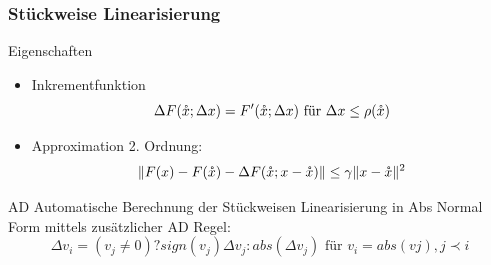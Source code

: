 \begin{frame}[<+->]
\frametitle{Stückweise Linearisierung}
\begin{block}{Eigenschaften}
 \begin{itemize}
  \item Inkrementfunktion 
    \[\Delta F(\mathring{x};\Delta x) = F'(\mathring{x};\Delta x)~ \text{für } \Delta x \leq \rho(\mathring{x})\]
  \item Approximation 2. Ordnung: \[\|F(x) - F(\mathring{x})- \Delta F(\mathring{x};x-\mathring{x})\| \leq \gamma \|x-\mathring{x}\|^2\]
 \end{itemize}
\end{block}
\begin{block}{AD}
 Automatische Berechnung der Stückweisen Linearisierung in Abs Normal Form mittels zusätzlicher AD Regel:
 \[
  \Delta v_i = (v_j \neq 0)?sign(v_j )\Delta v_j : abs(\Delta v_j) \text{ für } v_i = abs(vj), j\prec i
 \]
\end{block}

\end{frame}

